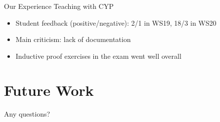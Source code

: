 \documentclass{beamer}
\begin{document}
\begin{frame}[fragile]{Our Experience Teaching with CYP}
\begin{itemize}[<+->]
  \item Student feedback (positive/negative): 2/1 in WS19, 18/3 in WS20
  \item Main criticism: lack of documentation
  \item Inductive proof exercises in the exam went well overall
\end{itemize}
\end{frame}

\section{Future Work}

\begin{frame}[standout]
\Large{\alert{Any questions?}}

\end{frame}

\end{document}
